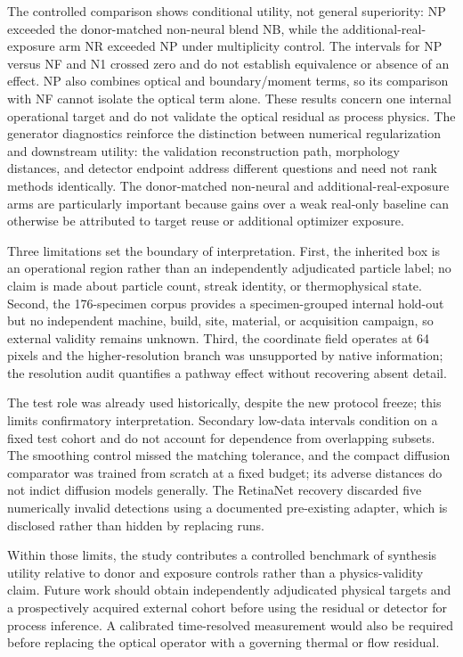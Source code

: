 The controlled comparison shows conditional utility, not general superiority: NP exceeded the donor-matched non-neural blend NB, while the additional-real-exposure arm NR exceeded NP under multiplicity control. The intervals for NP versus NF and N1 crossed zero and do not establish equivalence or absence of an effect. NP also combines optical and boundary/moment terms, so its comparison with NF cannot isolate the optical term alone. These results concern one internal operational target and do not validate the optical residual as process physics. The generator diagnostics reinforce the distinction between numerical regularization and downstream utility: the validation reconstruction path, morphology distances, and detector endpoint address different questions and need not rank methods identically. The donor-matched non-neural and additional-real-exposure arms are particularly important because gains over a weak real-only baseline can otherwise be attributed to target reuse or additional optimizer exposure.

Three limitations set the boundary of interpretation. First, the inherited box is an operational region rather than an independently adjudicated particle label; no claim is made about particle count, streak identity, or thermophysical state. Second, the 176-specimen corpus provides a specimen-grouped internal hold-out but no independent machine, build, site, material, or acquisition campaign, so external validity remains unknown. Third, the coordinate field operates at 64 pixels and the higher-resolution branch was unsupported by native information; the resolution audit quantifies a pathway effect without recovering absent detail.

The test role was already used historically, despite the new protocol freeze; this limits confirmatory interpretation. Secondary low-data intervals condition on a fixed test cohort and do not account for dependence from overlapping subsets. The smoothing control missed the matching tolerance, and the compact diffusion comparator was trained from scratch at a fixed budget; its adverse distances do not indict diffusion models generally. The RetinaNet recovery discarded five numerically invalid detections using a documented pre-existing adapter, which is disclosed rather than hidden by replacing runs.

Within those limits, the study contributes a controlled benchmark of synthesis utility relative to donor and exposure controls rather than a physics-validity claim. Future work should obtain independently adjudicated physical targets and a prospectively acquired external cohort before using the residual or detector for process inference. A calibrated time-resolved measurement would also be required before replacing the optical operator with a governing thermal or flow residual.
